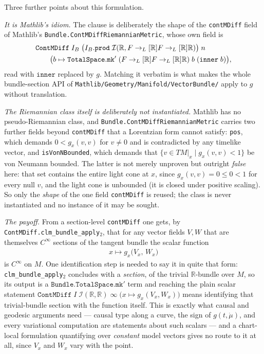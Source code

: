 \begin{definition}[Spacetime]
    Three further points about this formulation.

    \emph{It is Mathlib's idiom.} The clause is deliberately the shape of the \texttt{contMDiff} field of Mathlib's \texttt{Bundle.ContMDiffRiemannianMetric}, whose own field is
    \begin{align}
        &\mathtt{ContMDiff}\;I_B\;\big(I_B.\mathtt{prod}\;\mathcal{I}(\mathbb{R}, F \to_L[\mathbb{R}] F \to_L[\mathbb{R}] \mathbb{R})\big)\;n \notag \\
        &\qquad \big(b \mapsto \mathtt{TotalSpace.mk'}\;(F \to_L[\mathbb{R}] F \to_L[\mathbb{R}] \mathbb{R})\;b\;(\mathtt{inner}\;b)\big),
    \end{align}
    read with $\mathtt{inner}$ replaced by $g$. Matching it verbatim is what makes the whole bundle-section API of \texttt{Mathlib/Geometry/Manifold/VectorBundle/} apply to $g$ without translation.

    \emph{The Riemannian class itself is deliberately \emph{not} instantiated.} Mathlib has no pseudo-Riemannian class, and \texttt{Bundle.ContMDiffRiemannianMetric} carries two further fields beyond \texttt{contMDiff} that a Lorentzian form cannot satisfy: \texttt{pos}, which demands $0 < g_x(v,v)$ for $v \neq 0$ and is contradicted by any timelike vector, and \texttt{isVonNBounded}, which demands that $\{v \in TM|_x \mid g_x(v,v) < 1\}$ be von Neumann bounded. The latter is not merely unproven but outright \emph{false} here: that set contains the entire light cone at $x$, since $g_x(v,v) = 0 \le 0 < 1$ for every null $v$, and the light cone is unbounded (it is closed under positive scaling). So only the \emph{shape} of the one field \texttt{contMDiff} is reused; the class is never instantiated and no instance of it may be sought.

    \emph{The payoff.} From a section-level \texttt{contMDiff} one gets, by \texttt{ContMDiff.clm\_bundle\_apply\ensuremath{_2}}, that for any vector fields $V, W$ that are themselves $C^\infty$ sections of the tangent bundle the scalar function
    \begin{align}
        x \longmapsto g_x\big(V_x,\, W_x\big)
    \end{align}
    is $C^\infty$ on $M$. One identification step is needed to say it in quite that form: \texttt{clm\_bundle\_apply\ensuremath{_2}} concludes with a \emph{section}, of the trivial $\mathbb{R}$-bundle over $M$, so its output is a $\mathtt{Bundle.TotalSpace.mk'}$ term and reaching the plain scalar statement $\mathtt{ContMDiff}\;I\;\mathcal{I}(\mathbb{R},\mathbb{R})\;\infty\;\big(x \mapsto g_x(V_x, W_x)\big)$ means identifying that trivial-bundle section with the function itself. This is exactly what causal and geodesic arguments need --- causal type along a curve, the sign of $g(t,\dot\mu)$, and every variational computation are statements about such scalars --- and a chart-local formulation quantifying over \emph{constant} model vectors gives no route to it at all, since $V_x$ and $W_x$ vary with the point.
\end{definition}

